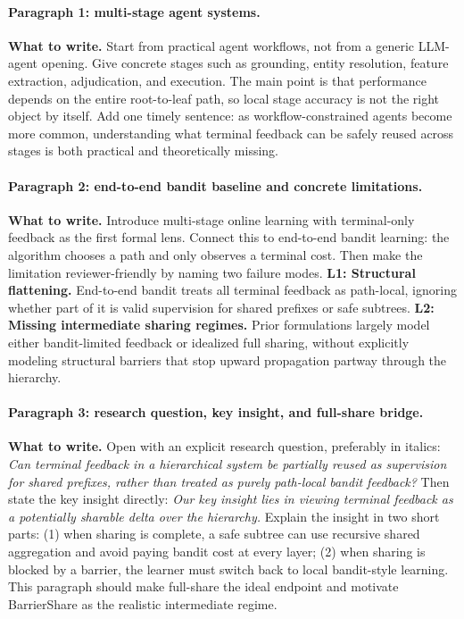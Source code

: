 \documentclass{article}
\newcommand{\towrite}[1]{\noindent\textbf{What to write.} #1}
\begin{document}
\paragraph{Paragraph 1: multi-stage agent systems.}
\towrite{Start from practical agent workflows, not from a generic LLM-agent opening. Give concrete stages such as grounding, entity resolution, feature extraction, adjudication, and execution. The main point is that performance depends on the entire root-to-leaf path, so local stage accuracy is not the right object by itself. Add one timely sentence: as workflow-constrained agents become more common, understanding what terminal feedback can be safely reused across stages is both practical and theoretically missing.}

\paragraph{Paragraph 2: end-to-end bandit baseline and concrete limitations.}
\towrite{Introduce multi-stage online learning with terminal-only feedback as the first formal lens. Connect this to end-to-end bandit learning: the algorithm chooses a path and only observes a terminal cost. Then make the limitation reviewer-friendly by naming two failure modes. \textbf{L1: Structural flattening.} End-to-end bandit treats all terminal feedback as path-local, ignoring whether part of it is valid supervision for shared prefixes or safe subtrees. \textbf{L2: Missing intermediate sharing regimes.} Prior formulations largely model either bandit-limited feedback or idealized full sharing, without explicitly modeling structural barriers that stop upward propagation partway through the hierarchy.}

\paragraph{Paragraph 3: research question, key insight, and full-share bridge.}
\towrite{Open with an explicit research question, preferably in italics: \emph{Can terminal feedback in a hierarchical system be partially reused as supervision for shared prefixes, rather than treated as purely path-local bandit feedback?} Then state the key insight directly: \emph{Our key insight lies in viewing terminal feedback as a potentially sharable delta over the hierarchy.} Explain the insight in two short parts: (1) when sharing is complete, a safe subtree can use recursive shared aggregation and avoid paying bandit cost at every layer; (2) when sharing is blocked by a barrier, the learner must switch back to local bandit-style learning. This paragraph should make full-share the ideal endpoint and motivate BarrierShare as the realistic intermediate regime.}
\end{document}

